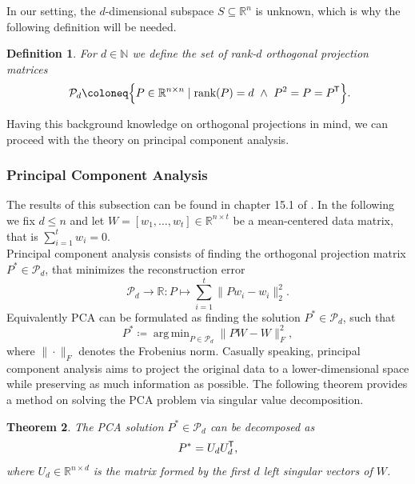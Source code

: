 \documentclass[11pt, a4paper]{article}
\newtheorem{theorem}{Theorem}[section]
\newtheorem{definition}[theorem]{Definition}
\newcommand{\N}{\mathbb{N}}
\newcommand{\R}{\mathbb{R}}
\renewcommand{\P}{\mathcal{P}}
\newcommand*{\tr}{^{\mkern-1.5mu\mathsf{T}}}
\DeclareMathOperator*{\argmin}{arg\,min}
\begin{document}
In our setting, the $d$-dimensional subspace $S \subseteq \R^n$ is unknown, which is why the following definition will be needed.

\begin{definition}
For $d \in \N$ we define the set of rank-$d$ orthogonal projection matrices
\[ \P_d \coloneq \Big \{ P \in \R^{n \times n} \mid \text{rank}(P) = d \ \wedge \ P^2 = P = P\tr  \Big \}. \]
\end{definition}

Having this background knowledge on orthogonal projections in mind, we can proceed with the theory on principal component analysis.

\subsubsection{Principal Component Analysis} \label{sec:PCA}

The results of this subsection can be found in chapter 15.1 of \cite{PCA}. In the following we fix $d \leq n$ and let $W = [w_1, \dots, w_t] \in \R^{n \times t}$ be a mean-centered data matrix, that is $\sum_{i=1}^{t}w_i=0$. \\

Principal component analysis consists of finding the orthogonal projection matrix $P^* \in \P_d$, that minimizes the reconstruction error
\[ \P_d \to \R : P \mapsto \sum_{i=1}^{t} \big \| Pw_i - w_i \big \|_2^2. \]
Equivalently PCA can be formulated as finding the solution $P^* \in \P_d$, such that
\[ P^* \coloneq \argmin_{P \in \P_d} \big \| PW - W \big \|_F^2, \]
where $\| \cdot \|_F$ denotes the Frobenius norm. Casually speaking, principal component analysis aims to project the original data to a lower-dimensional space while preserving as much information as possible. The following theorem provides a method on solving the PCA problem via singular value decomposition.

\begin{theorem} \label{thm:PCA}
The PCA solution $P^* \in \P_d$ can be decomposed as
\[ P^* = U_dU_d\tr , \]
where $U_d \in \R^{n \times d}$ is the matrix formed by the first $d$ left singular vectors of $W$.
\end{theorem}
\end{document}
